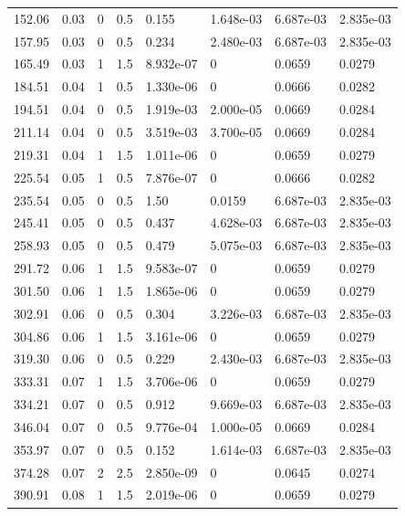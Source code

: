 \documentclass[preview]{standalone}
\begin{document}
{{\begin{tabular}{L{1.2cm}C{1.2cm} C{0.3cm}C{0.5cm} C{1.4cm}C{1.4cm} C{1.4cm}C{1.4cm}}
  152.06  &  0.03  & 0     & 0.5 &  0.155  & 1.648e-03  & 6.687e-03 &  2.835e-03   \\ 
  157.95  &  0.03  & 0     & 0.5 &  0.234  & 2.480e-03  & 6.687e-03 &  2.835e-03   \\ 
  165.49  &  0.03  & 1     & 1.5 &  8.932e-07  & 0  & 0.0659 &  0.0279   \\ 
  184.51  &  0.04  & 1     & 0.5 &  1.330e-06  & 0  & 0.0666 &  0.0282   \\ 
  194.51  &  0.04  & 0     & 0.5 &  1.919e-03  & 2.000e-05  & 0.0669 &  0.0284   \\ 
  211.14  &  0.04  & 0     & 0.5 &  3.519e-03  & 3.700e-05  & 0.0669 &  0.0284   \\ 
  219.31  &  0.04  & 1     & 1.5 &  1.011e-06  & 0  & 0.0659 &  0.0279   \\ 
  225.54  &  0.05  & 1     & 0.5 &  7.876e-07  & 0  & 0.0666 &  0.0282   \\ 
  235.54  &  0.05  & 0     & 0.5 &  1.50  & 0.0159  & 6.687e-03 &  2.835e-03   \\ 
  245.41  &  0.05  & 0     & 0.5 &  0.437  & 4.628e-03  & 6.687e-03 &  2.835e-03   \\ 
  258.93  &  0.05  & 0     & 0.5 &  0.479  & 5.075e-03  & 6.687e-03 &  2.835e-03   \\ 
  291.72  &  0.06  & 1     & 1.5 &  9.583e-07  & 0  & 0.0659 &  0.0279   \\ 
  301.50  &  0.06  & 1     & 1.5 &  1.865e-06  & 0  & 0.0659 &  0.0279   \\ 
  302.91  &  0.06  & 0     & 0.5 &  0.304  & 3.226e-03  & 6.687e-03 &  2.835e-03   \\ 
  304.86  &  0.06  & 1     & 1.5 &  3.161e-06  & 0  & 0.0659 &  0.0279   \\ 
  319.30  &  0.06  & 0     & 0.5 &  0.229  & 2.430e-03  & 6.687e-03 &  2.835e-03   \\ 
  333.31  &  0.07  & 1     & 1.5 &  3.706e-06  & 0  & 0.0659 &  0.0279   \\ 
  334.21  &  0.07  & 0     & 0.5 &  0.912  & 9.669e-03  & 6.687e-03 &  2.835e-03   \\ 
  346.04  &  0.07  & 0     & 0.5 &  9.776e-04  & 1.000e-05  & 0.0669 &  0.0284   \\ 
  353.97  &  0.07  & 0     & 0.5 &  0.152  & 1.614e-03  & 6.687e-03 &  2.835e-03   \\ 
  374.28  &  0.07  & 2     & 2.5 &  2.850e-09  & 0  & 0.0645 &  0.0274   \\ 
  390.91  &  0.08  & 1     & 1.5 &  2.019e-06  & 0  & 0.0659 &  0.0279   \\ 

\end{tabular}}}
\end{document}
